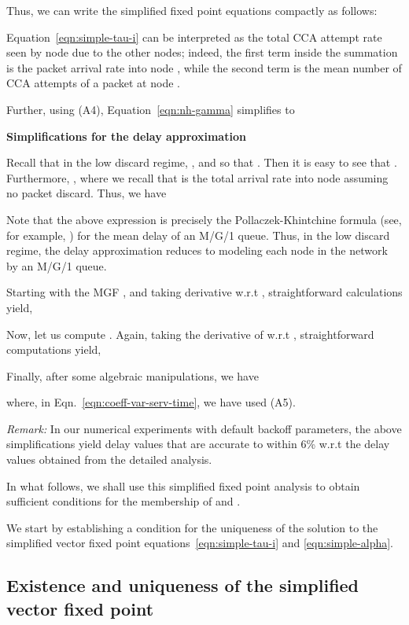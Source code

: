 \documentclass[12pt, draftclsnofoot, onecolumn]{IEEEtran}
\newcommand{\remark}[1]{{\emph{Remark:}} #1}
\newcommand{\gap}{\vspace{2mm}}
\begin{document}
Thus, we can write the simplified fixed point equations compactly as follows:

Equation~\ref{eqn:simple-tau-i} can be interpreted as the total CCA attempt rate seen by node  due to the other nodes; indeed, the first term inside the summation is the packet arrival rate into node , while the second term is the mean number of CCA attempts of a packet at node .
   
Further, using (A4), Equation~\eqref{eqn:nh-gamma} simplifies to


\gap
\noindent
\textbf{Simplifications for the delay approximation}

Recall that in the low discard regime, , and  so that . Then it is easy to see that . Furthermore, , where we recall that  is the total arrival rate into node  assuming no packet discard. Thus, we have



Note that the above expression is precisely the Pollaczek-Khintchine formula (see, for example, \cite{ross07prob-models}) for the mean delay of an M/G/1 queue. Thus, in the low discard regime, the delay approximation reduces to modeling each node in the network by an M/G/1 queue.

Starting with the MGF , and taking derivative w.r.t , straightforward calculations yield,


Now, let us compute . Again, taking the derivative of  w.r.t , straightforward computations yield,


Finally, after some algebraic manipulations, we have

where, in Eqn.~\eqref{eqn:coeff-var-serv-time}, we have used (A5). 

\gap
\noindent
\remark
In our numerical experiments with default backoff parameters, the above simplifications yield delay values that are accurate to within 6\% w.r.t the delay values obtained from the detailed analysis. 

In what follows, we shall use this simplified fixed point analysis to obtain sufficient conditions for the membership of  and . 

We start by establishing a condition for the uniqueness of the solution to the simplified vector fixed point equations~\eqref{eqn:simple-tau-i} and \eqref{eqn:simple-alpha}.

\subsection{Existence and uniqueness of the simplified vector fixed point}
\label{subsec:vector-uniqueness}
\end{document}
